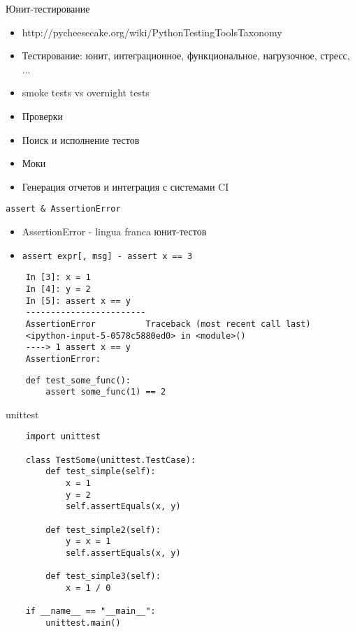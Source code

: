 \documentclass{article}
\begin{document}
\LARGE

\begin{center}Юнит-тестирование\end{center}
\begin{itemize}
	\item http://pycheesecake.org/wiki/PythonTestingToolsTaxonomy
	\item Тестирование: юнит, интеграционное, функциональное, нагрузочное, стресс, ...
	\item smoke tests vs overnight tests
	\item Проверки
	\item Поиск и исполнение тестов
	\item Моки
	\item Генерация отчетов и интеграция с системами CI
\end{itemize}
\newpage

\begin{center}\lstinline!assert & AssertionError!\end{center}
\begin{itemize}
	\item AssertionError - lingua franca юнит-тестов
	\item \lstinline!assert expr[, msg] - assert x == 3!
\end{itemize}

\begin{verbatim}
	In [3]: x = 1
	In [4]: y = 2
	In [5]: assert x == y
	------------------------
	AssertionError          Traceback (most recent call last)
	<ipython-input-5-0578c5880ed0> in <module>()
	----> 1 assert x == y
	AssertionError: 
\end{verbatim}

\begin{lstlisting}
	def test_some_func():
		assert some_func(1) == 2
\end{lstlisting}

\newpage

\begin{center}unittest\end{center}
\begin{lstlisting}
	import unittest

	class TestSome(unittest.TestCase):
	    def test_simple(self):
	        x = 1
	        y = 2
	        self.assertEquals(x, y)

	    def test_simple2(self):
	        y = x = 1
	        self.assertEquals(x, y)

	    def test_simple3(self):
	        x = 1 / 0

	if __name__ == "__main__":
	    unittest.main()
\end{lstlisting}
\newpage
\end{document}
